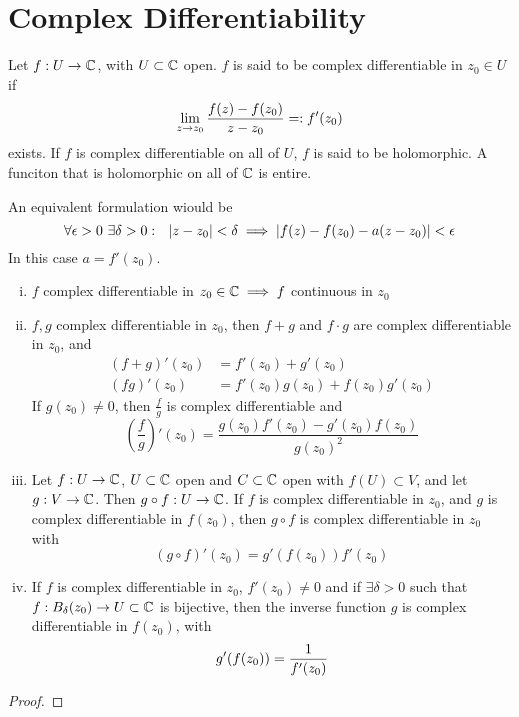 \documentclass[../../script.tex]{subfiles}
\begin{document}
\section{Complex Differentiability}

\begin{defi}
    Let $f: U \rightarrow \cmpln$, with $U \subset \cmpln$ open. $f$ is said to be complex differentiable in $z_0 \in U$ if 
    \[
        \limes{z}{z_0} \frac{f(z) - f(z_0)}{z - z_0} =: f'(z_0)
    \]
    exists. If $f$ is complex differentiable on all of $U$, $f$ is said to be holomorphic. 
    A funciton that is holomorphic on all of $\cmpln$ is entire.

    An equivalent formulation wiould be 
    \[
        \forall \epsilon > 0 ~\exists \delta > 0: ~~\abs{z - z_0} < \delta \implies \abs{f(z) - f(z_0) - a(z - z_0)} < \epsilon
    \]
    In this case $a = f'(z_0)$.
\end{defi}

\begin{thm}

    \begin{enumerate}[(i)]
        \item $f$ complex differentiable in $z_0 \in \cmpln \implies f$ continuous in $z_0$ 
        \item $f, g$ complex differentiable in $z_0$, then $f + g$ and $f \cdot g$ are complex differentiable in $z_0$, and 
        \begin{align*}
            (f + g)'(z_0) &= f'(z_0) + g'(z_0) \\
            (fg)'(z_0) &= f'(z_0)g(z_0) + f(z_0)g'(z_0) 
        \end{align*}
        If $g(z_0) \ne 0$, then $\frac{f}{g}$ is complex differentiable and 
        \[
            \left(\frac{f}{g}\right)'(z_0) = \frac{g(z_0)f'(z_0) - g'(z_0)f(z_0)}{g(z_0)^2}
        \]
        \item Let $f: U \rightarrow \cmpln$, $U \subset \cmpln$ open and $C \subset \cmpln$ open with $f(U) \subset V$, and let $g: V \rightarrow \cmpln$.
        Then $g \circ f: U \rightarrow \cmpln$. If $f$ is complex differentiable in $z_0$, and $g$ is complex differentiable in $f(z_0)$, then 
        $g \circ f$ is complex differentiable in $z_0$ with 
        \[
            (g \circ f)'(z_0) = g'(f(z_0)) f'(z_0)
        \]
        \item If $f$ is complex differentiable in $z_0$, $f'(z_0) \ne 0$
        and if $\exists \delta > 0$ such that $f: \oball[\delta](z_0) \rightarrow U \subset \cmpln$ is bijective, 
        then the inverse function $g$ is complex differentiable in $f(z_0)$, with 
        \[
            g'(f(z_0)) = \rec{f'(z_0)}
        \]
    \end{enumerate}
\end{thm}
\begin{proof}
    \reader
\end{proof}
\end{document}
